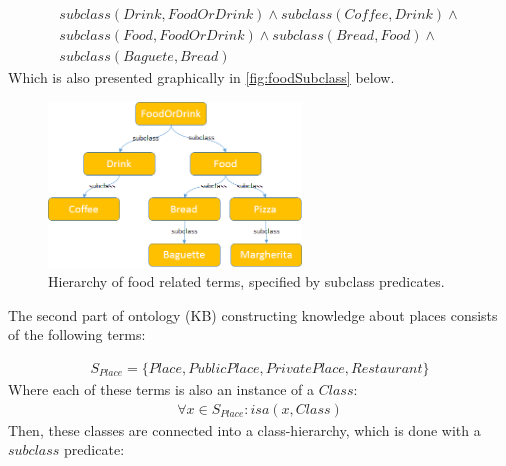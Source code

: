 \begin{equation}\label{as:kbFoodSubclasses}
\begin{gathered}
    subclass(Drink,FoodOrDrink) \land subclass(Coffee,Drink) \land \\
	subclass(Food,FoodOrDrink) \land subclass(Bread,Food) \land \\
	subclass(Baguete, Bread)
\end{gathered}
\end{equation}
Which is also presented graphically in \autoref{fig:foodSubclass} below.
\begin{figure}[H]
	\centering
		\includegraphics[width=0.6\textwidth]{figures/foodOntology.png}
	\caption{Hierarchy of food related terms, specified by subclass predicates.}
	\label{fig:foodSubclass}
\end{figure}

The second part of ontology (KB) constructing knowledge about places consists
of the following terms:

\begin{equation}\label{set:placeTerms}
\begin{gathered}
S_{Place} = \{Place,PublicPlace,PrivatePlace,Restaurant\}
\end{gathered}
\end{equation}
Where each of these terms is also an instance of a $Class$:
\begin{equation}\label{set:placeTermsClass}
\begin{gathered}
\forall x \in S_{Place}: isa(x,Class)
\end{gathered}
\end{equation}
Then, these classes are connected into a class-hierarchy, which is done with
a $subclass$ predicate:


